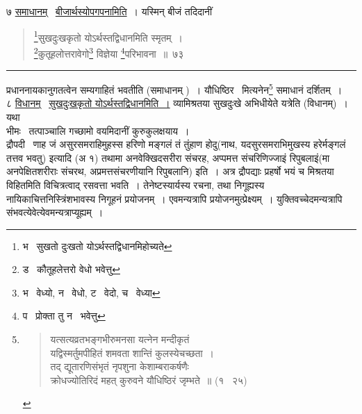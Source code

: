 \documentclass[11pt, openany]{book}
\begin{document}
७ \underline{समाधानम्} \textendash\ \underline{बीजार्थस्योपगपनामिति}~। यस्मिन् बीजं तदिदानीं

\newpage

\begin{quote}
{\na \renewcommand{\thefootnote}{1}\footnote{भ \textendash\ सुखतो दुःखतो योऽर्थस्तद्विधानमिहोच्यते}सुखदुःखकृतो योऽर्थस्तद्विधानमिति स्मृतम्~।\\
\renewcommand{\thefootnote}{2}\footnote{ड \textendash\ कौतूहलेत्तरो वेधो भवेत्तु}कुतूहलोत्तरावेगो\renewcommand{\thefootnote}{3}\footnote{भ \textendash\ वेध्यो, न \textendash\ वेधो, ट \textendash\ वेदो, च \textendash\ वेध्या} विज्ञेया \renewcommand{\thefootnote}{4}\footnote{प \textendash\ प्रोक्ता तु न \textendash\ भवेत्तु}परिभावना~॥~७३}
\end{quote}

\hrule

\vspace{2mm}
\noindent
प्रधाननायकानुगतत्वेन सम्यगाहितं भवतीति (समाधानम् )~। {\qt यौधिष्ठिर} \textendash\ मित्यनेन\renewcommand{\thefootnote}{*}\footnote{\begin{quote}
{\qt यत्सत्यव्रतभङ्गभीरुमनसा यत्नेन मन्दीकृतं\\
यद्विस्मर्तुमपीहितं शमवता शान्तिं कुलस्येचच्छता~।\\
तद् द्यूतारणिसंभृतं नृपशुना केशाम्बराकर्षणैः\\
क्रोधज्योतिरिदं महत् कुरुवने यौधिष्ठिरं जृम्भते~॥} (१ \textendash\ २५)
\end{quote}} समाधानं दर्शितम्~।\\

८ \underline{विधानम्} \textendash\ \underline{सुखदुःखकृतो योऽर्थस्तद्विधानमिति~।} व्यामिश्रतया सुखदुःखे अभिधीयेते यत्रेति (विधानम्)~। यथा \textendash \\

भीमः \textendash\ तत्पाञ्चालि गच्छामो वयमिदानीं कुरुकुलक्षयाय~।\\

द्रौपदी \textendash\ णाह जं असुरसमराहिमुहस्स हरिणो मङ्गलं तं तुंहाण होदु(नाथ, यदसुरसमराभिमुखस्य हरेर्मङ्गलं तत्तव भवतु) इत्यादि (अ १) तथा{\qt मा अनवेक्खिदसरीरा संचरह, अप्पमत्त संचरिणिज्जाइं रिपुबलाइं(मा अनपेक्षितशरीराः संचरथ, अप्रमत्तसंचरणीयानि रिपुबलानि)} इति~। अत्र द्रौपद्याः प्रहर्षो भयं च मिश्रतया विहितमिति विचित्रत्वाद् रसवत्ता भवति~। तेनेष्टस्यार्यस्य रचना, तथा निगूह्यस्य नायिकाचित्तनिस्त्रिंशभावस्य निगूहनं प्रयोजनम्~। एवमन्यत्रापि प्रयोजनमुत्प्रेक्ष्यम्~। युक्तिवच्चेदमन्यत्रापि संभवत्येवेत्येवमन्यत्राप्यूह्यम्~।\\
\end{document}
